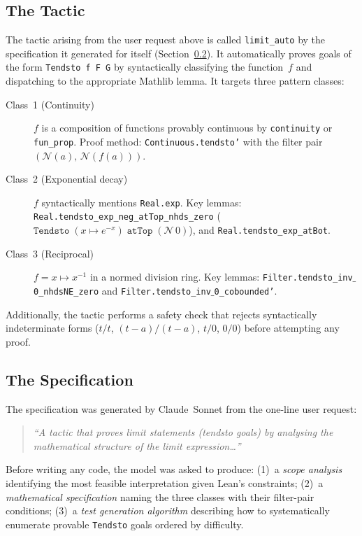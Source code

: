 \documentclass{llncs}
\begin{document}
\subsection{The Tactic}
\label{sec:tactic}

The tactic arising from the user request above is called \texttt{limit\_auto}
by the specification it generated for itself (Section~\ref{sec:spec}).
It automatically proves goals of the form \texttt{Tendsto~f~F~G} by
syntactically classifying the function~$f$ and dispatching to the appropriate Mathlib lemma.
It targets three pattern classes:

\begin{description}
  \item[Class~1 (Continuity)]
        $f$ is a composition of functions provably continuous by
        \texttt{continuity} or \texttt{fun\_prop}.
        Proof method: \texttt{Continuous.tendsto'} with the filter pair
        $(\mathcal{N}(a),\, \mathcal{N}(f(a)))$.

  \item[Class~2 (Exponential decay)]
        $f$ syntactically mentions \texttt{Real.exp}.
        Key lemmas: \texttt{Real.tendsto\_exp\_neg\_atTop\_nhds\_zero}
        ($\texttt{Tendsto}\;(x \mapsto e^{-x})\;\texttt{atTop}\;(\mathcal{N}\,0)$),
        and \texttt{Real.tendsto\_exp\_atBot}.

  \item[Class~3 (Reciprocal)]
        $f = x \mapsto x^{-1}$ in a normed division ring.
        Key lemmas: \texttt{Filter.tendsto\_inv$\text{\_}$0\_nhdsNE\_zero}
        and \texttt{Filter.tendsto\_inv$\text{\_}$0\_cobounded'}.
\end{description}

Additionally, the tactic performs a safety check that rejects syntactically
indeterminate forms ($t/t$, $(t{-}a)/(t{-}a)$, $t/0$, $0/0$)
before attempting any proof.

\subsection{The Specification}
\label{sec:spec}

The specification was generated by Claude~Sonnet from the one-line user request:
\begin{quote}
\textit{``A tactic that proves limit statements (tendsto goals) by analysing
the mathematical structure of the limit expression\ldots''}
\end{quote}
Before writing any code, the model was asked to produce:
(1)~a \emph{scope analysis} identifying the most feasible interpretation
given Lean's constraints;
(2)~a \emph{mathematical specification} naming the three classes with their
filter-pair conditions;
(3)~a \emph{test generation algorithm} describing how to systematically
enumerate provable \texttt{Tendsto} goals ordered by difficulty.
\end{document}
